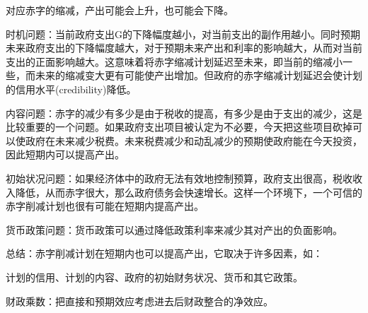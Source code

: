 \documentclass{article}
\begin{document}
对应赤字的缩减，产出可能会上升，也可能会下降。

时机问题：当前政府支出G的下降幅度越小，对当前支出的副作用越小。同时预期未来政府支出的下降幅度越大，对于预期未来产出和利率的影响越大，从而对当前支出的正面影响越大。这意味着将赤字缩减计划延迟至未来，即当前的缩减小一些，而未来的缩减变大更有可能使产出增加。但政府的赤字缩减计划延迟会使计划的信用水平(credibility)降低。

内容问题：赤字的减少有多少是由于税收的提高，有多少是由于支出的减少，这是比较重要的一个问题。如果政府支出项目被认定为不必要，今天把这些项目砍掉可以使政府在未来减少税费。未来税费减少和动乱减少的预期使政府能在今天投资，因此短期内可以提高产出。

初始状况问题：如果经济体中的政府无法有效地控制预算，政府支出很高，税收收入降低，从而赤字很大，那么政府债务会快速增长。这样一个环境下，一个可信的赤字削减计划也很有可能在短期内提高产出。

货币政策问题：货币政策可以通过降低政策利率来减少其对产出的负面影响。

\hspace*{\fill}

总结：赤字削减计划在短期内也可以提高产出，它取决于许多因素，如：

计划的信用、计划的内容、政府的初始财务状况、货币和其它政策。

财政乘数：把直接和预期效应考虑进去后财政整合的净效应。

























 
\end{document}
